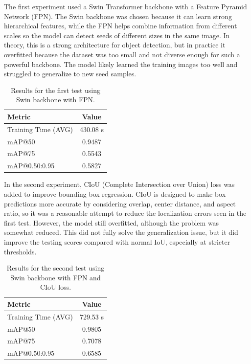 The first experiment used a Swin Transformer backbone with a Feature Pyramid Network (FPN). The Swin backbone was chosen because it can learn strong hierarchical features, while the FPN helps combine information from different scales so the model can detect seeds of different sizes in the same image. In theory, this is a strong architecture for object detection, but in practice it overfitted because the dataset was too small and not diverse enough for such a powerful backbone. The model likely learned the training images too well and struggled to generalize to new seed samples.

\begin{table}[h]
\centering
\begin{tabular}{l c}
\hline
Metric & Value \\
\hline
Training Time (AVG) & 430.08 s \\
mAP@50 & 0.9487 \\
mAP@75 & 0.5543 \\
mAP@0.50:0.95 & 0.5827 \\
\hline
\end{tabular}
\caption{Results for the first test using Swin backbone with FPN.}
\label{tab:first_test}
\end{table}

In the second experiment, CIoU (Complete Intersection over Union) loss was added to improve bounding box regression. CIoU is designed to make box predictions more accurate by considering overlap, center distance, and aspect ratio, so it was a reasonable attempt to reduce the localization errors seen in the first test. However, the model still overfitted, although the problem was somewhat reduced. This did not fully solve the generalization issue, but it did improve the testing scores compared with normal IoU, especially at stricter thresholds.

\begin{table}[h]
\centering
\begin{tabular}{l c}
\hline
Metric & Value \\
\hline
Training Time (AVG) & 729.53 s \\
mAP@50 & 0.9805 \\
mAP@75 & 0.7078 \\
mAP@0.50:0.95 & 0.6585 \\
\hline
\end{tabular}
\caption{Results for the second test using Swin backbone with FPN and CIoU loss.}
\label{tab:second_test}
\end{table}


